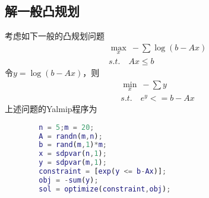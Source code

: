     \subsection{解一般凸规划}
        \par
        考虑如下一般的凸规划问题
        \begin{align*}
        & \max_x \ -\sum \log(b - Ax)\\
        & s.t.\quad Ax \leqslant b
        \end{align*}
        令$y = \log(b-Ax)$，则
        \begin{align*}
        & \min_x \ -\sum y\\
        & s.t. \quad e^y <= b-Ax
        \end{align*}
        上述问题的Yalmip程序为
        \begin{lstlisting}[language = Matlab]
        %% 一般凸规划
        n = 5;m = 20;
        A = randn(m,n);
        b = rand(m,1)*m;
        x = sdpvar(n,1);
        y = sdpvar(m,1);
        constraint = [exp(y <= b-Ax)];
        obj = -sum(y);
        sol = optimize(constraint,obj);
        \end{lstlisting}
